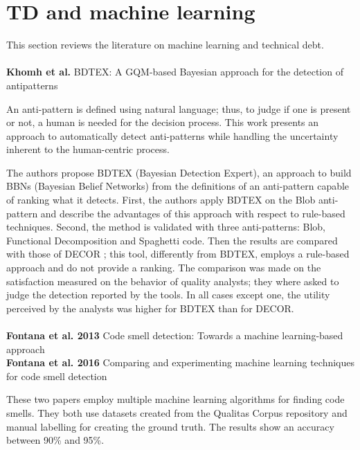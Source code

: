\section{TD and machine learning}

This section reviews the literature on machine learning and technical debt.
\\
\\

\textbf{Khomh et al.} \cite{khomh2011bdtex} BDTEX: A GQM-based Bayesian approach for the detection of antipatterns

An anti-pattern is defined using natural language; thus, to judge if one is present or not, a human is needed for the decision process.
This work presents an approach to automatically detect anti-patterns while handling the uncertainty inherent to the human-centric process. 

The authors propose BDTEX (Bayesian Detection Expert), an approach to build BBNs (Bayesian Belief Networks) from the definitions of an anti-pattern capable of ranking what it detects. First, the authors apply BDTEX on the Blob anti-pattern and describe the advantages of this approach with respect to rule-based techniques. Second, the method is validated with three anti-patterns: Blob, Functional Decomposition and Spaghetti code. Then the results are compared with those of DECOR \cite{moha2009decor}; this tool, differently from BDTEX, employs a rule-based approach and do not provide a ranking. The comparison was made on the  satisfaction measured on the behavior of quality analysts; they where asked to judge the detection reported by the tools. In all cases except one, the utility perceived by the analysts was higher for BDTEX than for DECOR.
\\
\\
\textbf{Fontana et al. 2013} \cite{fontana2013code} Code smell detection: Towards a machine learning-based approach
\\
\textbf{Fontana et al. 2016} \cite{fontana2016comparing} Comparing and experimenting machine learning techniques for code smell detection

These two papers employ multiple machine learning algorithms for finding code smells. They both use datasets created from the Qualitas Corpus repository \cite{tempero2010qualitas} and manual labelling for creating the ground truth.
The results show an accuracy between 90\% and 95\%. 

